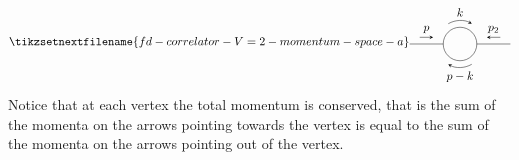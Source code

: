 \documentclass[fleqn]{NotesClass}
\begin{document}
    \begin{equation}
        \tikzsetnextfilename{fd-correlator-V=2-momentum-space-a}
        \begin{tikzpicture}[baseline=(current bounding box)]
            \draw (-1.5, 0) -- (-0.5, 0);
            \draw (0.5, 0) -- (1.5, 0);
            \draw[->, >=stealth] (-1.2, 0.2) -- (-0.8, 0.2) node [midway, above] {\(p\)};
            \draw[->, >=stealth] (1.2, 0.2) -- (0.8, 0.2) node [midway, above] {\(p_2\)};
            \draw (0, 0) circle [radius = 0.5];
            \draw[->, >=stealth] (120:0.7) arc (120:60:0.7) node [midway, above] {\(k\)};
            \draw[->, >=stealth] (300:0.7) arc (300:240:0.7) node [midway, below] {\(p - k\)};
        \end{tikzpicture}
    \end{equation}
    Notice that at each vertex the total momentum is conserved, that is the sum of the momenta on the arrows pointing towards the vertex is equal to the sum of the momenta on the arrows pointing out of the vertex.
    
\end{document}
